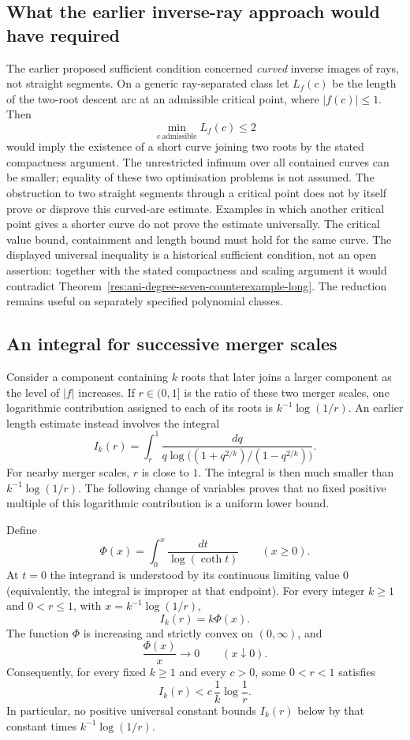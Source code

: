 \documentclass[11pt]{article}
\begin{document}
\subsection*{What the earlier inverse-ray approach would have required}

The earlier proposed sufficient condition concerned \emph{curved}
inverse images of rays, not straight segments.  On a generic ray-separated class let $L_f(c)$ be
the length of the two-root descent arc at an admissible critical point,
where $|f(c)|\le1$.  Then
\[
 \min_{c\ \mathrm{admissible}}L_f(c)\le2
\]
would imply the existence of a short curve joining two roots by the stated compactness
argument.  The unrestricted infimum over all contained curves can be
smaller; equality of these two optimisation problems is not assumed.
The obstruction to two straight segments through a critical point does
not by itself prove or disprove this curved-arc estimate.  Examples in which another critical point gives a shorter curve do not
prove the estimate universally. The critical value bound, containment and
length bound must hold for the same curve. The displayed universal
inequality is a historical sufficient condition, not an open assertion:
together with the stated compactness and scaling argument it would
contradict Theorem~\ref{res:ani-degree-seven-counterexample-long}.
The reduction remains useful on separately specified polynomial classes.

\subsection*{An integral for successive merger scales}\label{subsec:merger-integral}
Consider a component containing $k$ roots that later joins a larger
component as the level of $|f|$ increases. If $r\in(0,1]$ is the ratio
of these two merger scales, one logarithmic contribution assigned to each
of its roots is $k^{-1}\log(1/r)$. An earlier length estimate instead
involves the integral
\[
 I_k(r)=\int_r^1
 \frac{dq}{q\log\bigl((1+q^{2/k})/(1-q^{2/k})\bigr)}.
\]
For nearby merger scales, $r$ is close to $1$. The integral is then much
smaller than $k^{-1}\log(1/r)$. The following change of variables proves
that no fixed positive multiple of this logarithmic contribution is a
uniform lower bound.

\begin{theorem}
\label{res:orlicz-currency}
Define
\[
 \Phi(x)=\int_0^x\frac{dt}{\log(\coth t)}\qquad(x\ge0).
\]
At $t=0$ the integrand is understood by its continuous limiting value $0$
(equivalently, the integral is improper at that endpoint).
For every integer $k\ge1$ and $0<r\le1$, with
$x=k^{-1}\log(1/r)$,
\[
 I_k(r)=k\Phi(x).                                      \tag{O1}
\]
The function $\Phi$ is increasing and strictly convex on $(0,\infty)$, and
\[
 \frac{\Phi(x)}x\longrightarrow0\qquad(x\downarrow0). \tag{O2}
\]
Consequently, for every fixed $k\ge1$ and every $c>0$, some $0<r<1$
satisfies
\[
 I_k(r)<c\,\frac1k\log\frac1r.                        \tag{O3}
\]
In particular, no positive universal constant bounds $I_k(r)$ below
by that constant times $k^{-1}\log(1/r)$.
\end{theorem}
\end{document}
